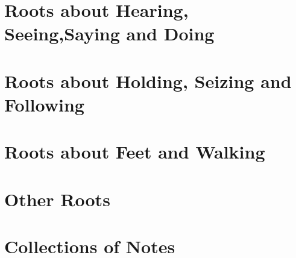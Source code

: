 \ifdefined\printvocabulary

\part{Roots about Hearing, Seeing,Saying and Doing}







\part{Roots about Holding, Seizing and Following}




\part{Roots about Feet and Walking} 







\part{Other Roots}













\part{Collections of Notes}







\fi